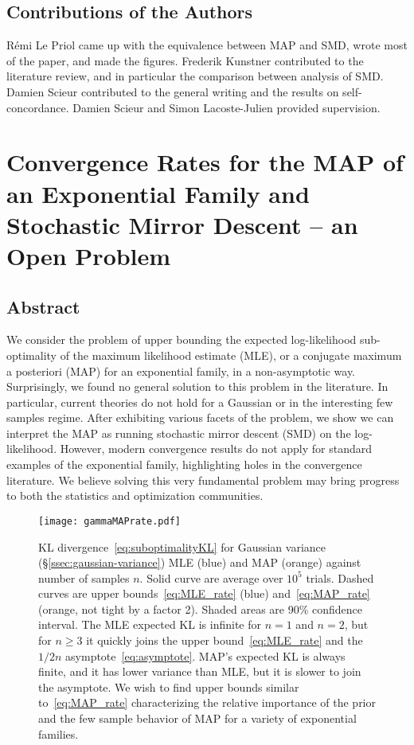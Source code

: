 \section{Contributions of the Authors}
R\'emi Le Priol came up with the equivalence between MAP and SMD, wrote most of the paper, and made the figures.
Frederik Kunstner contributed to the literature review, and in particular the comparison between analysis of SMD.
Damien Scieur contributed to the general writing and the results on self-concordance.
Damien Scieur and Simon Lacoste-Julien provided supervision.

\chapter{Convergence Rates for the MAP of an Exponential Family and Stochastic Mirror Descent -- an Open Problem}

\section*{Abstract}
We consider the problem of upper bounding the expected log-likelihood sub-optimality of the maximum likelihood estimate (MLE), or a conjugate maximum a posteriori (MAP) for an exponential family, in a non-asymptotic way.
Surprisingly, we found no general solution to this problem in the literature. In particular, current theories do not hold for a Gaussian or in the interesting few samples regime.
After exhibiting various facets of the problem, we show we can interpret the MAP as running stochastic mirror descent (SMD) on the log-likelihood. However, modern convergence results do not apply for standard examples of the exponential family, highlighting holes in the convergence literature.
We believe solving this very fundamental problem may bring progress to both the statistics and optimization communities.


\begin{figure}[t]
	\centering
\texttt{[image: gammaMAPrate.pdf]}
	\caption[KL divergence for Gaussian variance MLE and MAP]
	{KL divergence~\eqref{eq:suboptimalityKL} for Gaussian variance (\S\ref{ssec:gaussian-variance}) MLE (blue) and MAP (orange) against number of samples $n$. 
		Solid curve  are average over $10^5$ trials.
		Dashed curves are upper bounds~\eqref{eq:MLE_rate} (blue) and~\eqref{eq:MAP_rate} (orange, not tight by a factor 2).
		Shaded areas are 90\% confidence interval.
		The MLE expected KL is infinite for $n=1$ and $n=2$, but for $n\geq3$ it quickly joins the upper bound~\eqref{eq:MLE_rate} and the $1/2n$ asymptote~\eqref{eq:asymptote}.
		MAP's expected KL is always finite, and it has lower variance than MLE, but it is slower to join the asymptote.
		We wish to find upper bounds similar to~\eqref{eq:MAP_rate} characterizing the relative importance of the prior and the few sample behavior of MAP for a variety of exponential families.
	}
	\label{fig:curves}
\end{figure}


